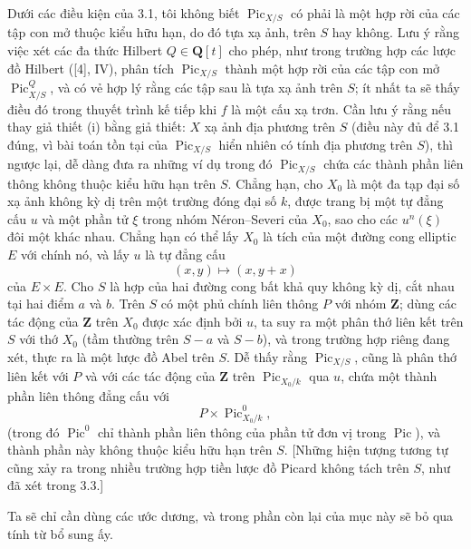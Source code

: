  Dưới các điều kiện của 3.1, tôi không biết
$\operatorname{Pic}_{X/S}$ có phải là một hợp rời của các tập con mở thuộc
kiểu hữu hạn, do đó tựa xạ ảnh, trên $S$ hay không. Lưu ý rằng việc xét các
đa thức Hilbert $Q\in\mathbf Q[t]$ cho phép, như trong trường hợp các lược đồ
Hilbert ([4], IV), phân tích $\operatorname{Pic}_{X/S}$ thành một hợp rời của
các tập con mở $\operatorname{Pic}^{Q}_{X/S}$, và có vẻ hợp lý rằng các tập
sau là tựa xạ ảnh trên $S$; ít nhất ta sẽ thấy điều đó trong thuyết trình kế
tiếp khi $f$ là một cấu xạ trơn. Cần lưu ý rằng nếu thay giả thiết (i) bằng
giả thiết: $X$ xạ ảnh địa phương trên $S$ (điều này đủ để 3.1 đúng, vì bài toán
tồn tại của $\operatorname{Pic}_{X/S}$ hiển nhiên có tính địa phương trên
$S$), thì ngược lại, dễ dàng
đưa ra những ví dụ trong đó $\operatorname{Pic}_{X/S}$ chứa các thành phần
liên thông không thuộc kiểu hữu hạn trên $S$. Chẳng hạn, cho $X_0$ là một đa
tạp đại số xạ ảnh không kỳ dị trên một trường đóng đại số $k$, được trang bị
một tự đẳng cấu $u$ và một phần tử $\xi$ trong nhóm Néron--Severi của $X_0$,
sao cho các $u^n(\xi)$ đôi một khác nhau. Chẳng hạn có thể lấy $X_0$ là tích
của một đường cong elliptic $E$ với chính nó, và lấy $u$ là tự đẳng cấu
\[
(x,y)\longmapsto(x,y+x)
\]
của $E\times E$. Cho $S$ là hợp của hai đường cong bất khả quy không kỳ dị,
cắt nhau tại hai điểm $a$ và $b$. Trên $S$ có một phủ chính liên thông $P$ với
nhóm $\mathbf Z$; dùng các tác động của $\mathbf Z$ trên $X_0$ được xác định
bởi $u$, ta suy ra một phân thớ liên kết trên $S$ với thớ $X_0$ (tầm thường
trên $S-a$ và $S-b$), và trong trường hợp riêng đang xét, thực ra là một lược
đồ Abel trên $S$. Dễ thấy rằng $\operatorname{Pic}_{X/S}$, cũng là phân thớ
liên kết với $P$ và với các tác động của $\mathbf Z$ trên
$\operatorname{Pic}_{X_0/k}$ qua $u$, chứa một thành phần liên thông đẳng cấu
với
\[
P\times\operatorname{Pic}^{0}_{X_0/k},
\]
(trong đó $\operatorname{Pic}^{0}$ chỉ thành phần liên thông của phần tử đơn
vị trong $\operatorname{Pic}$), và thành phần này không thuộc kiểu hữu hạn
trên $S$. [Những hiện tượng tương tự cũng xảy ra trong nhiều trường hợp tiền
lược đồ Picard không tách trên $S$, như đã xét trong 3.3.]


Ta sẽ chỉ cần dùng các ước dương, và trong phần còn lại của mục này sẽ bỏ qua
tính từ bổ sung ấy.

